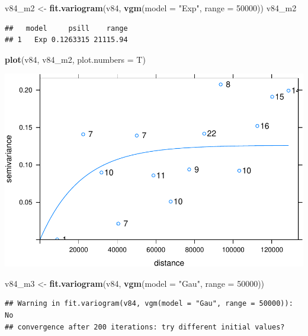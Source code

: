 \documentclass[11pt,]{article}
\newenvironment{Shaded}{\begin{snugshade}}{\end{snugshade}}
\newcommand{\KeywordTok}[1]{\textcolor[rgb]{0.13,0.29,0.53}{\textbf{#1}}}
\newcommand{\DataTypeTok}[1]{\textcolor[rgb]{0.13,0.29,0.53}{#1}}
\newcommand{\DecValTok}[1]{\textcolor[rgb]{0.00,0.00,0.81}{#1}}
\newcommand{\StringTok}[1]{\textcolor[rgb]{0.31,0.60,0.02}{#1}}
\newcommand{\NormalTok}[1]{#1}
\begin{document}
\begin{Shaded}
\begin{Highlighting}[]
\NormalTok{v84_m2 <-}\StringTok{ }\KeywordTok{fit.variogram}\NormalTok{(v84, }\KeywordTok{vgm}\NormalTok{(}\DataTypeTok{model =} \StringTok{"Exp"}\NormalTok{, }\DataTypeTok{range =} \DecValTok{50000}\NormalTok{))}
\NormalTok{v84_m2}
\end{Highlighting}
\end{Shaded}

\begin{verbatim}
##   model     psill    range
## 1   Exp 0.1263315 21115.94
\end{verbatim}

\begin{Shaded}
\begin{Highlighting}[]
\KeywordTok{plot}\NormalTok{(v84, v84_m2, }\DataTypeTok{plot.numbers =}\NormalTok{ T)}
\end{Highlighting}
\end{Shaded}

\includegraphics{proyecto_files/figure-latex/unnamed-chunk-36-2.pdf}

\begin{Shaded}
\begin{Highlighting}[]
\NormalTok{v84_m3 <-}\StringTok{ }\KeywordTok{fit.variogram}\NormalTok{(v84, }\KeywordTok{vgm}\NormalTok{(}\DataTypeTok{model =} \StringTok{"Gau"}\NormalTok{, }\DataTypeTok{range =} \DecValTok{50000}\NormalTok{))}
\end{Highlighting}
\end{Shaded}

\begin{verbatim}
## Warning in fit.variogram(v84, vgm(model = "Gau", range = 50000)): No
## convergence after 200 iterations: try different initial values?
\end{verbatim}
\end{document}
